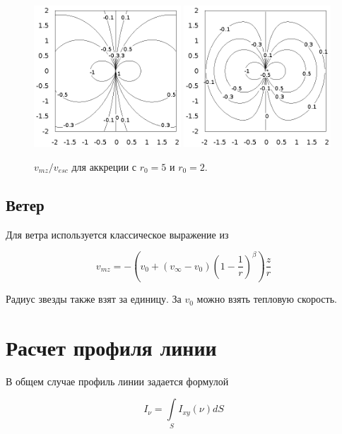 \documentclass{article}
\begin{document}
\begin{figure}[h]
    \centering
    \includegraphics[width=0.49\textwidth]{plot5}
    \includegraphics[width=0.49\textwidth]{plot2}
    \caption{$v_{mz}/v_{esc}$ для аккреции с $r_0=5$ и $r_0=2$.}
\end{figure}

\subsection{Ветер}

Для ветра используется классическое выражение из \cite{castor79}

\begin{equation}
v_{mz} = -\left(v_0 + \left(v_{\infty} - v_0\right)\left(1 - \frac{1}{r}\right)^\beta\right)\frac{z}{r}
\end{equation}

Радиус звезды также взят за единицу. За $v_0$ можно взять тепловую скорость.

\section{Расчет профиля линии}

В общем случае профиль линии задается формулой

\begin{equation}
I_{\nu} = \int \limits_{S} I_{xy}(\nu) dS
\end{equation}
\end{document}
